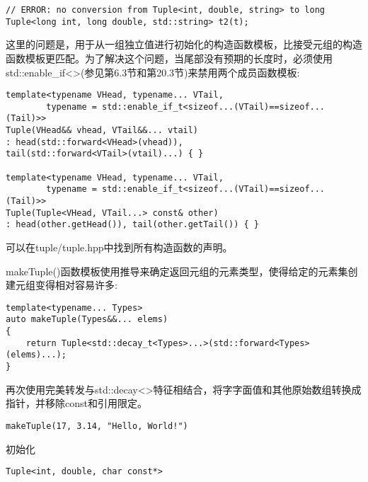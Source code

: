 \begin{lstlisting}[style=styleCXX]
// ERROR: no conversion from Tuple<int, double, string> to long
Tuple<long int, long double, std::string> t2(t);
\end{lstlisting}

这里的问题是，用于从一组独立值进行初始化的构造函数模板，比接受元组的构造函数模板更匹配。为了解决这个问题，当尾部没有预期的长度时，必须使用std::enable\_if<>(参见第6.3节和第20.3节)来禁用两个成员函数模板:

\begin{lstlisting}[style=styleCXX]
template<typename VHead, typename... VTail,
		typename = std::enable_if_t<sizeof...(VTail)==sizeof...(Tail)>>
Tuple(VHead&& vhead, VTail&&... vtail)
: head(std::forward<VHead>(vhead)),
tail(std::forward<VTail>(vtail)...) { }

template<typename VHead, typename... VTail,
		typename = std::enable_if_t<sizeof...(VTail)==sizeof...(Tail)>>
Tuple(Tuple<VHead, VTail...> const& other)
: head(other.getHead()), tail(other.getTail()) { }
\end{lstlisting}

可以在tuple/tuple.hpp中找到所有构造函数的声明。

makeTuple()函数模板使用推导来确定返回元组的元素类型，使得给定的元素集创建元组变得相对容易许多:

\begin{lstlisting}[style=styleCXX]
template<typename... Types>
auto makeTuple(Types&&... elems)
{
	return Tuple<std::decay_t<Types>...>(std::forward<Types>(elems)...);
}
\end{lstlisting}

再次使用完美转发与std::decay<>特征相结合，将字字面值和其他原始数组转换成指针，并移除const和引用限定。

\begin{lstlisting}[style=styleCXX]
makeTuple(17, 3.14, "Hello, World!")
\end{lstlisting}

初始化

\begin{lstlisting}[style=styleCXX]
Tuple<int, double, char const*>
\end{lstlisting}







